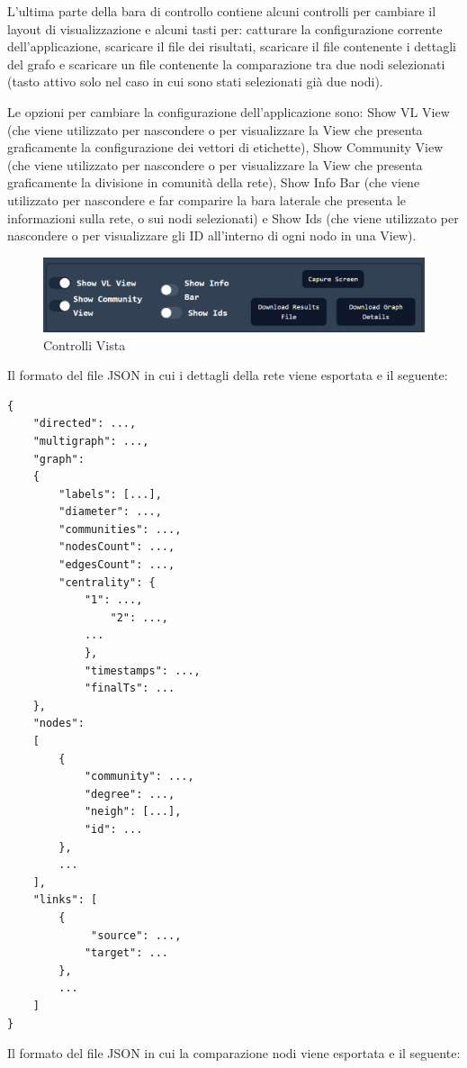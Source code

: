 \documentclass[a4paper,12pt]{report}
\begin{document}
\begin{itemize}
			L'ultima parte della bara di controllo contiene alcuni controlli per cambiare il layout di visualizzazione e alcuni tasti per: catturare la configurazione corrente dell'applicazione, scaricare il file dei risultati, scaricare il file contenente i dettagli del grafo e scaricare un file contenente la comparazione tra due nodi selezionati (tasto attivo solo nel caso in cui sono stati selezionati già due nodi). 

			Le opzioni per cambiare la configurazione dell'applicazione sono: Show VL View (che viene utilizzato per nascondere o per visualizzare la View che presenta graficamente la configurazione dei vettori di etichette), Show Community View (che viene utilizzato per nascondere o per visualizzare la View che presenta graficamente la divisione in comunità della rete), Show Info Bar (che viene utilizzato per nascondere e far comparire la bara laterale che presenta le informazioni sulla rete, o sui nodi selezionati) e Show Ids (che viene utilizzato per nascondere o per visualizzare gli ID all'interno di ogni nodo in una View). 

			\begin{center}
			\begin{figure}[H]
			\centering
			\includegraphics[width=0.9\linewidth,keepaspectratio]{viewcontrol}
			\caption{Controlli Vista}
			\end{figure}
			\end{center}

\pagebreak
			Il formato del file JSON in cui i dettagli della rete viene esportata e il seguente:
\begin{lstlisting}
{
	"directed": ...,
	"multigraph": ...,
	"graph": 
	{
		"labels": [...],
		"diameter": ...,
		"communities": ...,
		"nodesCount": ...,
		"edgesCount": ...,
		"centrality": {
			"1": ...,
      			"2": ...,
			...
    		},
    		"timestamps": ...,
    		"finalTs": ...
  	},
	"nodes": 
	[
		{
			"community": ..., 
			"degree": ..., 
			"neigh": [...], 
			"id": ...
		},
		...
  	],
	"links": [
		{
			 "source": ..., 
			"target": ...
		},
		...
	]
}

\end{lstlisting}

\pagebreak

			Il formato del file JSON in cui la comparazione nodi viene esportata e il seguente:


\end{itemize}
\end{document}
